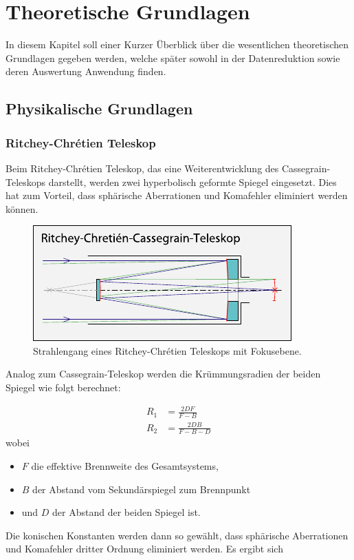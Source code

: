 \chapter{Theoretische Grundlagen}

In diesem Kapitel soll einer Kurzer Überblick über die wesentlichen theoretischen Grundlagen gegeben werden, welche später sowohl in der Datenreduktion sowie deren Auswertung Anwendung finden.

\section{Physikalische Grundlagen}

\subsection{Ritchey-Chrétien Teleskop}

Beim Ritchey-Chrétien Teleskop, das eine Weiterentwicklung des Cassegrain-Teleskops darstellt, werden zwei hyperbolisch geformte Spiegel eingesetzt. Dies hat zum Vorteil, dass sphärische Aberrationen und Komafehler eliminiert werden können.

\begin{figure}[htb]
  \centering
  \includegraphics[scale=2]{rc_telescope.pdf}
  \caption[Strahlengang eines Ritchey-Chrétien Teleskops]{Strahlengang eines Ritchey-Chrétien Teleskops mit Fokusebene\cite{rc_telescope}.}
\end{figure}

Analog zum Cassegrain-Teleskop werden die Krümmungsradien der beiden Spiegel wie folgt berechnet:

\begin{align}
	R_1 &= \frac{2DF}{F-B}\\
    R_2 &= \frac{2DB}{F-B-D}
\end{align}
wobei
\begin{itemize}
	\item $F$ die effektive Brennweite des Gesamtsystems,
    \item $B$ der Abstand vom Sekundärspiegel zum Brennpunkt
    \item und $D$ der Abstand der beiden Spiegel ist.
\end{itemize}
Die konischen Konstanten werden dann so gewählt, dass sphärische Aberrationen und Komafehler dritter Ordnung eliminiert werden. Es ergibt sich\cite[S. 508-510]{optical_engineering}

